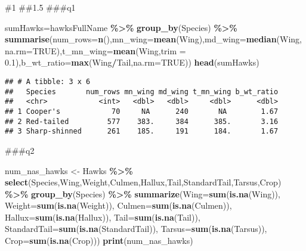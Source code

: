 \documentclass[
]{article}
\newenvironment{Shaded}{\begin{snugshade}}{\end{snugshade}}
\newcommand{\AttributeTok}[1]{\textcolor[rgb]{0.13,0.29,0.53}{#1}}
\newcommand{\ConstantTok}[1]{\textcolor[rgb]{0.56,0.35,0.01}{#1}}
\newcommand{\FloatTok}[1]{\textcolor[rgb]{0.00,0.00,0.81}{#1}}
\newcommand{\FunctionTok}[1]{\textcolor[rgb]{0.13,0.29,0.53}{\textbf{#1}}}
\newcommand{\NormalTok}[1]{#1}
\newcommand{\OtherTok}[1]{\textcolor[rgb]{0.56,0.35,0.01}{#1}}
\newcommand{\SpecialCharTok}[1]{\textcolor[rgb]{0.81,0.36,0.00}{\textbf{#1}}}
\begin{document}
\#1 \#\#1.5 \#\#\#q1

\begin{Shaded}
\begin{Highlighting}[]
\NormalTok{sumHawks}\OtherTok{=}\NormalTok{hawksFullName }\SpecialCharTok{\%\textgreater{}\%}
  \FunctionTok{group\_by}\NormalTok{(Species) }\SpecialCharTok{\%\textgreater{}\%}
  \FunctionTok{summarise}\NormalTok{(}\AttributeTok{num\_rows=}\FunctionTok{n}\NormalTok{(),}\AttributeTok{mn\_wing=}\FunctionTok{mean}\NormalTok{(Wing),}\AttributeTok{md\_wing=}\FunctionTok{median}\NormalTok{(Wing,}\AttributeTok{na.rm=}\ConstantTok{TRUE}\NormalTok{),}\AttributeTok{t\_mn\_wing=}\FunctionTok{mean}\NormalTok{(Wing,}\AttributeTok{trim =} \FloatTok{0.1}\NormalTok{),}\AttributeTok{b\_wt\_ratio=}\FunctionTok{max}\NormalTok{(Wing}\SpecialCharTok{/}\NormalTok{Tail,}\AttributeTok{na.rm=}\ConstantTok{TRUE}\NormalTok{))}
\FunctionTok{head}\NormalTok{(sumHawks)}
\end{Highlighting}
\end{Shaded}

\begin{verbatim}
## # A tibble: 3 x 6
##   Species       num_rows mn_wing md_wing t_mn_wing b_wt_ratio
##   <chr>            <int>   <dbl>   <dbl>     <dbl>      <dbl>
## 1 Cooper's            70     NA      240       NA        1.67
## 2 Red-tailed         577    383.     384      385.       3.16
## 3 Sharp-shinned      261    185.     191      184.       1.67
\end{verbatim}

\#\#\#q2

\begin{Shaded}
\begin{Highlighting}[]
\NormalTok{num\_nas\_hawks }\OtherTok{\textless{}{-}}\NormalTok{ Hawks }\SpecialCharTok{\%\textgreater{}\%} 
  \FunctionTok{select}\NormalTok{(Species,Wing,Weight,Culmen,Hallux,Tail,StandardTail,Tarsus,Crop) }\SpecialCharTok{\%\textgreater{}\%}
  \FunctionTok{group\_by}\NormalTok{(Species) }\SpecialCharTok{\%\textgreater{}\%}
  \FunctionTok{summarize}\NormalTok{(}\AttributeTok{Wing=}\FunctionTok{sum}\NormalTok{(}\FunctionTok{is.na}\NormalTok{(Wing)), }\AttributeTok{Weight=}\FunctionTok{sum}\NormalTok{(}\FunctionTok{is.na}\NormalTok{(Weight)), }\AttributeTok{Culmen=}\FunctionTok{sum}\NormalTok{(}\FunctionTok{is.na}\NormalTok{(Culmen)), }\AttributeTok{Hallux=}\FunctionTok{sum}\NormalTok{(}\FunctionTok{is.na}\NormalTok{(Hallux)), }\AttributeTok{Tail=}\FunctionTok{sum}\NormalTok{(}\FunctionTok{is.na}\NormalTok{(Tail)), }\AttributeTok{StandardTail=}\FunctionTok{sum}\NormalTok{(}\FunctionTok{is.na}\NormalTok{(StandardTail)), }\AttributeTok{Tarsus=}\FunctionTok{sum}\NormalTok{(}\FunctionTok{is.na}\NormalTok{(Tarsus)), }\AttributeTok{Crop=}\FunctionTok{sum}\NormalTok{(}\FunctionTok{is.na}\NormalTok{(Crop)))}
\FunctionTok{print}\NormalTok{(num\_nas\_hawks)}
\end{Highlighting}
\end{Shaded}
\end{document}
